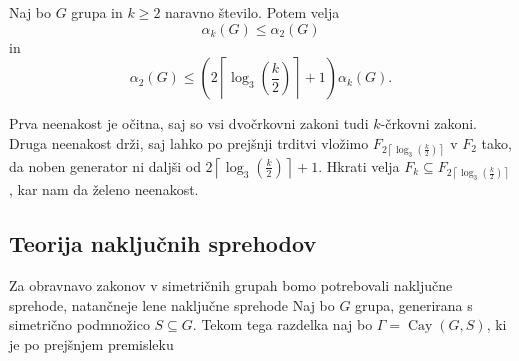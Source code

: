 \begin{posledica}\label{psl_veccrkovni_zakoni_meje}
Naj bo $G$ grupa in $k \ge 2$ naravno število. Potem velja \begin{equation*}
     \alpha_k(G) \le  \alpha_2(G) 
\end{equation*}  
in \begin{equation*}
\alpha_2(G) \le \left( {2 \left\lceil \log_3 \left(\frac{k}{2} \right) \right\rceil + 1  } \right) \alpha_k(G).
\end{equation*}  
\end{posledica}
\begin{dokaz}
    Prva neenakost je očitna, saj so vsi dvočrkovni zakoni tudi $k$-črkovni zakoni. Druga neenakost drži, saj lahko po prejšnji trditvi vložimo $F_{{2 \left\lceil \log_3(\frac{k}{2}) \right\rceil}}$ v $F_2$
    tako, da noben generator ni daljši od ${2 \left\lceil \log_3(\frac{k}{2}) \right\rceil + 1  }$. Hkrati velja $F_k \subseteq F_{{2 \left\lceil \log_3(\frac{k}{2}) \right\rceil}}$, kar nam da želeno neenakost.
\end{dokaz}


\subsection{Teorija naključnih sprehodov}

Za obravnavo zakonov v simetričnih grupah bomo potrebovali naključne sprehode, natančneje lene naključne sprehode %
Naj bo $G$ grupa, generirana s simetrično podmnožico $S \subseteq G$. Tekom tega razdelka naj bo $\Gamma = \operatorname{Cay}(G, S)$, ki je po prejšnjem premisleku 



